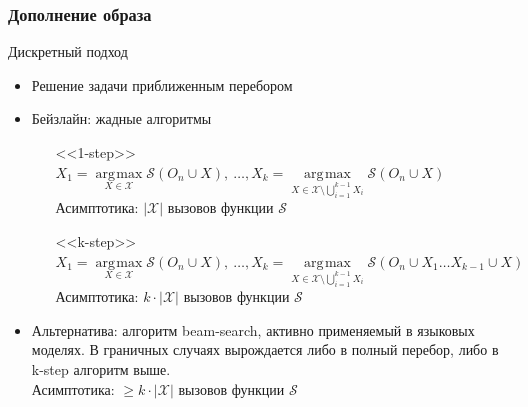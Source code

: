 \documentclass[10pt]{beamer}
\DeclareMathOperator*{\argmax}{\arg\!\max}
\begin{document}
\begin{frame}
	\frametitle{Дополнение образа}
	\begin{block}{Дискретный подход}
		\begin{itemize}
			\item Решение задачи приближенным перебором
			\item Бейзлайн: жадные алгоритмы
			\begin{itemize}
				\item[<<1-step>>] $X_1 = \argmax\limits_{X\in\mathcal{X}}{\mathcal{S}(O_n\cup X)},~\dots , X_k = \argmax\limits_{X\in\mathcal{X}\setminus \bigcup\limits_{i=1}^{k-1} X_i} \mathcal{S}(O_n\cup X)$\\
				Асимптотика: $|\mathcal{X}|$ вызовов функции $\mathcal{S}$\\
				
				\item[<<k-step>>] $X_1 = \argmax\limits_{X\in\mathcal{X}}{\mathcal{S}(O_n\cup X)},~\dots , X_k = \argmax\limits_{X\in\mathcal{X}\setminus \bigcup\limits_{i=1}^{k-1} X_i} \mathcal{S}(O_n\cup X_1\dots X_{k-1}\cup X)$\\
				Асимптотика: $k\cdot|\mathcal{X}|$ вызовов функции $\mathcal{S}$
			\end{itemize}
				
			\item Альтернатива: алгоритм beam-search, активно применяемый в языковых моделях. В граничных случаях вырождается либо в полный перебор, либо в k-step алгоритм выше.\\
			Асимптотика:  $\geqslant k\cdot|\mathcal{X}|$ вызовов функции $\mathcal{S}$
		\end{itemize}
	\end{block}
\end{frame}
\end{document}
